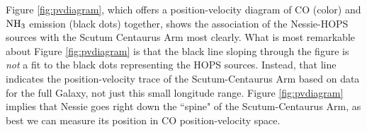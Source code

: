 Figure \ref{fig:pvdiagram}, which offers a position-velocity diagram of CO (color) and ${\rm NH}_3$ emission (black dots) together, shows the association of the Nessie-HOPS sources with the Scutum Centaurus Arm most clearly.  What is most remarkable about Figure \ref{fig:pvdiagram} is that the black line sloping through the figure is {\it not} a fit to the black dots representing the HOPS sources.  Instead, that line indicates the position-velocity trace of the Scutum-Centaurus Arm based on \citep{Dame2011} data for the full Galaxy, not just this small longitude range.   Figure \ref{fig:pvdiagram} implies that Nessie goes right down the ``spine" of the Scutum-Centaurus Arm, as best we can measure its position in CO position-velocity space.

